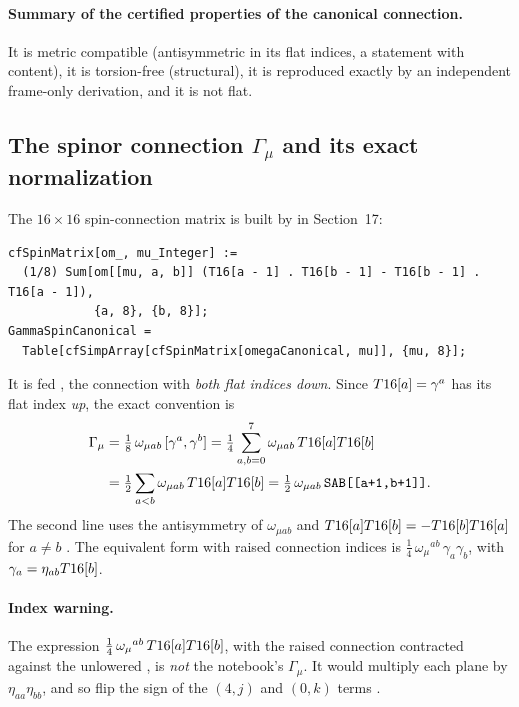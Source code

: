 \paragraph{Summary of the certified properties of the canonical connection.} It is metric
compatible (antisymmetric in its flat indices, a statement with content), it is torsion-free
(structural), it is reproduced exactly by an independent frame-only derivation, and it is not
flat.

\subsection{The spinor connection \texorpdfstring{$\Gamma_\mu$}{Gamma-mu} and its exact normalization}
\label{csc:spinmatrix}\label{sec:9.7}

The $16\times16$ spin-connection matrix is built by  in Section~17:

{\scriptsize
\begin{verbatim}
cfSpinMatrix[om_, mu_Integer] :=
  (1/8) Sum[om[[mu, a, b]] (T16[a - 1] . T16[b - 1] - T16[b - 1] . T16[a - 1]),
            {a, 8}, {b, 8}];
GammaSpinCanonical =
  Table[cfSimpArray[cfSpinMatrix[omegaCanonical, mu]], {mu, 8}];
\end{verbatim}
}

It is fed , the connection with \emph{both flat indices down}. Since
$T16[a]=\gamma^a$ has its flat index \emph{up}, the exact convention is
\begin{equation}
\begin{aligned}
  \Gamma_\mu&=\tfrac18\,\omega_{\mu ab}\,[\gamma^a,\gamma^b]
   =\tfrac14\sum_{a,b=0}^{7}\omega_{\mu ab}\,T16[a]T16[b]\\
  &=\tfrac12\sum_{a<b}\omega_{\mu ab}\,T16[a]T16[b]
   =\tfrac12\,\omega_{\mu ab}\,\texttt{SAB[[a+1,b+1]]} .
\end{aligned}
\end{equation}
The second line uses the antisymmetry of $\omega_{\mu ab}$ and $T16[a]T16[b]=-T16[b]T16[a]$
for $a\neq b$ \cfderived. The equivalent form with raised connection indices is
$\tfrac14\,\omega_\mu{}^{ab}\,\gamma_a\gamma_b$, with $\gamma_a=\eta_{ab}T16[b]$.

\paragraph{Index warning.} The expression $\tfrac14\,\omega_\mu{}^{ab}\,T16[a]T16[b]$, with the
raised connection contracted against the unlowered , is \emph{not} the notebook's
$\Gamma_\mu$. It would multiply each plane by $\eta_{aa}\eta_{bb}$, and so flip the sign of the
$(4,j)$ and $(0,k)$ terms \cfderived.

